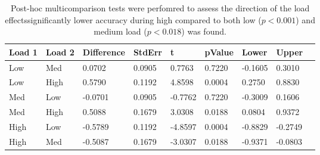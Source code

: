 \begin{table}
\centering
\begin{tabular}[0.2em]{@{}lllllllll@{}}\toprule
Load 1 & Load 2 & Difference & StdErr & t & pValue & Lower & Upper\\\toprule[0.2em]
Low & Med & 0.0702 & 0.0905 & 0.7763 & 0.7220 & -0.1605 & 0.3010 \\\midrule
Low & High & 0.5790 & 0.1192 & 4.8598 & 0.0004 & 0.2750 & 0.8830 \\\midrule
Med & Low & -0.0701 & 0.0905 & -0.7762 & 0.7220 & -0.3009 & 0.1606 \\\midrule
Med & High & 0.5088 & 0.1679 & 3.0308 & 0.0188 & 0.0804 & 0.9372 \\\midrule
High & Low & -0.5789 & 0.1192 & -4.8597 & 0.0004 & -0.8829 & -0.2749 \\\midrule
High & Med & -0.5087 & 0.1679 & -3.0307 & 0.0188 & -0.9371 & -0.0803 \\\bottomrule[0.2em]
\end{tabular}
\caption{Post-hoc multicomparison tests were perfomred to assess the direction of the load effectssignificantly lower accuracy during high compared to both low ($p<0.001$) and medium load ($p<0.018$) was found.\label{tabel:behPHStudy1Acc}}
\end{table}
